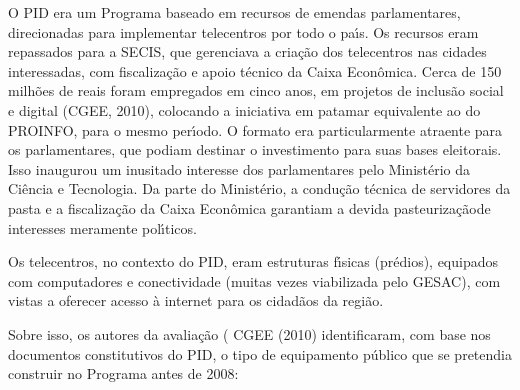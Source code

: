 \documentclass[
12pt,		%
openright,	%
twoside,  %
a4paper,			%
chapter=TITLE,		%
english,			%
french,				%
spanish,			%
brazil				%
]{USPSC-classe/USPSC}
\begin{document}
O PID era um Programa baseado em recursos de emendas parlamentares, direcionadas para implementar telecentros por todo o pa\'{\i}s. Os recursos eram repassados para a SECIS, que gerenciava a cria\c{c}\~ao dos telecentros nas cidades interessadas, com fiscaliza\c{c}\~ao e apoio t\'ecnico da Caixa Econ\^omica. Cerca de 150 milh\~oes de reais foram empregados em cinco anos, em projetos de inclus\~ao social e digital (CGEE, 2010), colocando a iniciativa em patamar equivalente ao do PROINFO, para o mesmo per\'{\i}odo. O formato era particularmente atraente para os parlamentares, que podiam destinar o investimento para suas bases eleitorais. Isso inaugurou um inusitado interesse dos parlamentares pelo Minist\'erio da Ci\^encia e Tecnologia. Da parte do Minist\'erio, a condu\c{c}\~ao t\'ecnica de servidores da pasta e a fiscaliza\c{c}\~ao da Caixa Econ\^omica garantiam a devida \textquotedbl pasteuriza\c{c}\~ao\textquotedbl  de interesses meramente pol\'{\i}ticos.

















Os telecentros, no contexto do PID, eram estruturas f\'{\i}sicas (pr\'edios), equipados com computadores e conectividade (muitas vezes viabilizada pelo GESAC), com vistas a oferecer acesso \`a internet para os cidad\~aos da regi\~ao.

















Sobre isso, os autores da avalia\c{c}\~ao ( CGEE (2010) identificaram, com base nos documentos constitutivos do PID, o tipo de equipamento p\'ublico que se pretendia construir no Programa antes de 2008:


















\noindent\begin{center}\mbox{\centering{}}\end{center}
\end{document}
